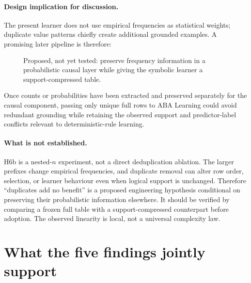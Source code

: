 \documentclass[11pt]{article}
\newcommand{\implication}{\paragraph{Design implication for discussion.}}
\newcommand{\boundary}{\paragraph{What is not established.}}
\begin{document}
\implication
The present learner does not use empirical frequencies as statistical weights;
duplicate value patterns chiefly create additional grounded examples. A
promising later pipeline is therefore:

\begin{figure}[ht]
\centering
{}
\caption{Proposed, not yet tested: preserve frequency information in a
probabilistic causal layer while giving the symbolic learner a support-compressed
table.}
\label{fig:dedup-proposal}
\end{figure}

Once counts or probabilities have been extracted and preserved separately for
the causal component, passing only unique full rows to ABA Learning could avoid
redundant grounding while retaining the observed support and predictor-label
conflicts relevant to deterministic-rule learning.

\boundary
H6b is a nested-\(n\) experiment, not a direct deduplication ablation. The
larger prefixes change empirical frequencies, and duplicate removal can alter
row order, selection, or learner behaviour even when logical support is
unchanged. Therefore ``duplicates add no benefit'' is a proposed engineering
hypothesis conditional on preserving their probabilistic information elsewhere.
It should be verified by comparing a frozen full table with a support-compressed
counterpart before adoption. The observed linearity is local, not a universal
complexity law.

\section{What the five findings jointly support}
\end{document}
